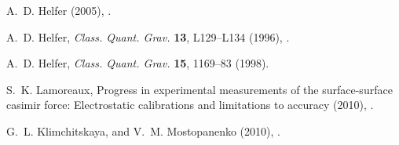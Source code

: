 \documentclass[
%
draft    %
,numberedheadings 
,bibliocites
  ]
  {aipproc}
\begin{document}
\begin{thebibliography}{57}
A.~D. Helfer  (2005), .

A.~D. Helfer, \emph{Class. Quant. Grav.} \textbf{13}, L129--L134 (1996),
  .

A.~D. Helfer, \emph{Class. Quant. Grav.} \textbf{15}, 1169--83 (1998).

S.~K. Lamoreaux, Progress in experimental measurements of the surface-surface
  casimir force: Electrostatic calibrations and limitations to accuracy (2010),
  .

G.~L. Klimchitskaya, and V.~M. Mostopanenko (2010),
  .

\end{thebibliography}
\end{document}
